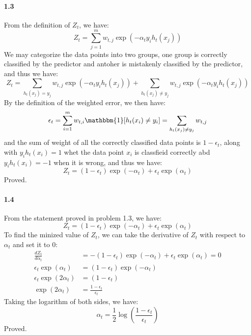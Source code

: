 \documentclass[11pt]{article}
\begin{document}
\paragraph{1.3}
From the definition of $Z_t$, we have:
\begin{equation}
  Z_t = \sum_{j=1}^m w_{t,j} \exp(-\alpha_t y_i h_t(x_j))
\end{equation}
We may categorize the data points into two groups, one group is correctly classified by the predictor and antoher is mistakenly classified by the predictor, and thus we have:
\begin{equation}
Z_t = \sum_{h_t(x_j) = y_j} w_{t,j} \exp(-\alpha_t y_i h_t(x_j)) + \sum_{h_t(x_j) \neq y_j} w_{t,j} \exp(-\alpha_t y_i h_t(x_j))
\end{equation}
By the definition of the weighted error, we then have:
\begin{equation}
\epsilon_t = \sum_{i=1}^m w_{t,i} \mathbbm{1}[h_t(x_i) \neq y_i] = \sum_{h_t(x_j) \neq y_j} w_{t,j}
\end{equation}
and the sum of weight of all the correctly classified data points is $1-\epsilon_t$, along with $y_ih_t(x_i)=1$ whet the data point $x_i$ is classfieid correctly abd $y_ih_t(x_i) = -1$ when it is wrong, and thus we have:
\begin{equation}
  Z_t = (1-\epsilon_t) \exp(-\alpha_t) + \epsilon_t \exp(\alpha_t)
\end{equation} 
Proved.

\paragraph{1.4}
From the statement proved in problem 1.3, we have:
\begin{equation}
  Z_t = (1-\epsilon_t) \exp(-\alpha_t) + \epsilon_t \exp(\alpha_t)
\end{equation}
To find the minized value of $Z_t$, we can take the derivative of $Z_t$ with respect to $\alpha_t$ and set it to 0:
\begin{equation}
  \begin{split}
    \frac{dZ_t}{d\alpha_t} &= -(1-\epsilon_t) \exp(-\alpha_t) + \epsilon_t \exp(\alpha_t) = 0 \\ 
    \epsilon_t \exp(\alpha_t) &= (1-\epsilon_t) \exp(-\alpha_t) \\
    \epsilon_t \exp(2\alpha_t) &= (1-\epsilon_t) \\
    \exp(2\alpha_t) &= \frac{1-\epsilon_t}{\epsilon_t} 
  \end{split}
\end{equation}
Taking the logarithm of both sides, we have:
\begin{equation}
  \alpha_t = \frac{1}{2}\log(\frac{1-\epsilon_t}{\epsilon_t})
\end{equation}
Proved.
\end{document}
